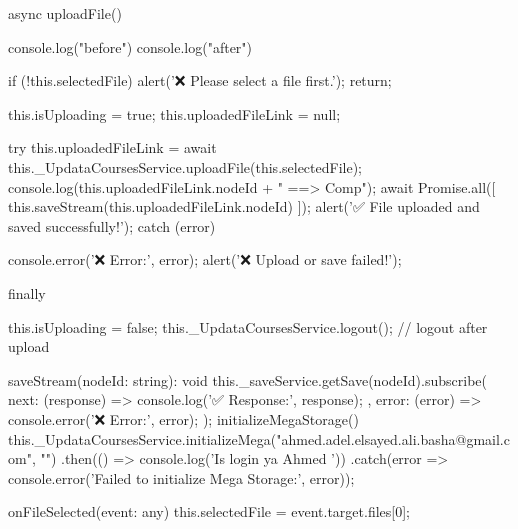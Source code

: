 async uploadFile() {
    console.log("before")
    console.log("after")

    if (!this.selectedFile) {
      alert('❌ Please select a file first.');
      return;
    }
  
    this.isUploading = true;
    this.uploadedFileLink = null;
  
    try {
      this.uploadedFileLink = await this._UpdataCoursesService.uploadFile(this.selectedFile);
      console.log(this.uploadedFileLink.nodeId + " ==> Comp");
        await Promise.all([
        this.saveStream(this.uploadedFileLink.nodeId)
      ]);
      alert('✅ File uploaded and saved successfully!');
    } catch (error) {
      console.error('❌ Error:', error);
      alert('❌ Upload or save failed!');
      
    } finally {
      this.isUploading = false;
      this._UpdataCoursesService.logout(); // logout after upload

    }
  }
  saveStream(nodeId: string): void {
    this._saveService.getSave(nodeId).subscribe({
      next: (response) => {
        console.log('✅ Response:', response);
      },
      error: (error) => {
        console.error('❌ Error:', error);
      }
    });
  }
  initializeMegaStorage() {
    this._UpdataCoursesService.initializeMega("ahmed.adel.elsayed.ali.basha@gmail.com", "")
      .then(() => console.log('Is login ya Ahmed  '))
      .catch(error => console.error('Failed to initialize Mega Storage:', error));
  }


  onFileSelected(event: any) {
    this.selectedFile = event.target.files[0];
  }
